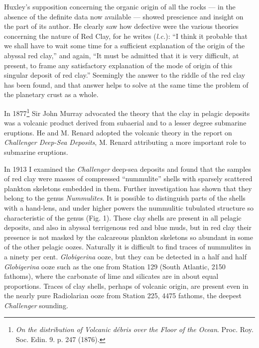 \documentclass[a4paper, 12pt, oneside, landscape]{article}
\begin{document}
Huxley's supposition concerning the organic origin of all the rocks --- in the absence of the definite data now available --- showed prescience and insight on the part of its author. He clearly saw how defective were the various theories concerning the nature of Red Clay, for he writes (\emph{l.c.}): ``I think it probable that we shall have to wait some time for a sufficient explanation of the origin of the abyssal red clay,'' and again, ``It must be admitted that it is very difficult, at present, to frame any satisfactory explanation of the mode of origin of this singular deposit of red clay.'' Seemingly the answer to the riddle of the red clay has been found, and that answer helps to solve at the same time the problem of the planetary crust as a whole.

In 1877\footnote{\emph{On the distribution of Volcanic débris over the Floor of the Ocean}. Proc. Roy. Soc. Edin. 9. p. 247 (1876).} Sir John Murray advocated the theory that the clay in pelagic deposits was a volcanic product derived from subaerial and to a lesser degree submarine eruptions. He and M. Renard adopted the volcanic theory in the report on \emph{Challenger Deep-Sea Deposits}, M. Renard attributing a more important role to submarine eruptions.

In 1913 I examined the \emph{Challenger} deep-sea deposits and found that the samples of red clay were masses of compressed ``nummulite'' shells with sparsely scattered plankton skeletons embedded in them. Further investigation has shown that they belong to the genus \emph{Nummulites}. It is possible to distinguish parts of the shells with a hand-lens, and under higher powers the nummulitic tubulated structure so characteristic of the genus (Fig. 1). These clay shells are present in all pelagic deposits, and also in abyssal terrigenous red and blue muds, but in red clay their presence is not masked by the calcareous plankton skeletons so abundant in some of the other pelagic oozes. Naturally it is difficult to find traces of nummulites in a ninety per cent. \emph{Globigerina} ooze, but they can be detected in a half and half \emph{Globigerina} ooze such as the one from Station 129 (South Atlantic, 2150 fathoms), where the carbonate of lime and silicates are in about equal proportions. Traces of clay shells, perhaps of volcanic origin, are present even in the nearly pure Radiolarian ooze from Station 225, 4475 fathoms, the deepest \emph{Challenger} sounding.
\end{document}
